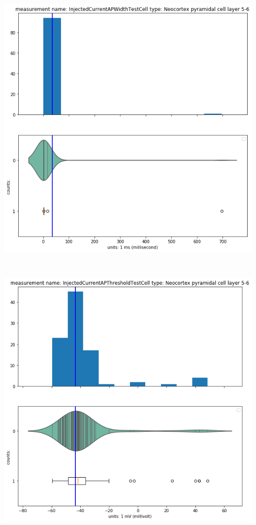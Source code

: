     \begin{center}
    \includegraphics[width=0.7\linewidth]{notebooks_converted/needata_thesis_files/needata_thesis_5_17}
    \end{center}
    { \hspace*{\fill} \\}
    
    \begin{center}
   \includegraphics[width=0.7\linewidth]{notebooks_converted/needata_thesis_files/needata_thesis_5_18}
    \end{center}
    { \hspace*{\fill} \\}
    
